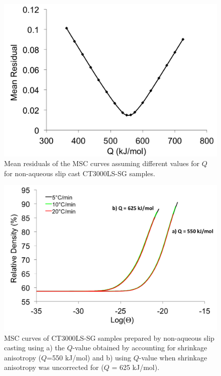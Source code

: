 \newpage
\begin{figure}[H]
	\centering
	\includegraphics[width=\textwidth]{Chapter-6/Figures/Figure4.png}
	\caption{Mean residuals of the MSC curves assuming different values for $Q$ for non-aqueous slip cast CT3000LS-SG samples.}
	\label{Ch6-figure:Figure4}
\end{figure}

\newpage
\begin{figure}[H]
	\centering
	\includegraphics[width=\textwidth]{Chapter-6/Figures/Figure5.png}
	\caption{MSC curves of CT3000LS-SG samples prepared by non-aqueous slip casting using a) the $Q$-value obtained by accounting for shrinkage anisotropy ($Q$=550 kJ/mol) and b) using $Q$-value when shrinkage anisotropy was uncorrected for ($Q$ = 625 kJ/mol).}
	\label{Ch6-figure:Figure5}
\end{figure}

